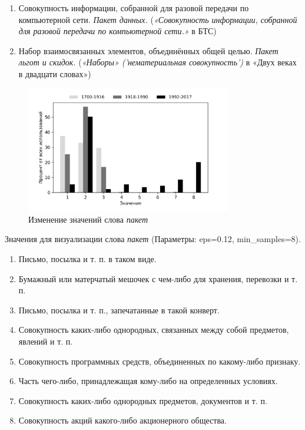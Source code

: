 \documentclass[LI,VKR]{HSEUniversity}
\begin{document}
\begin{enumerate}
    \item Совокупность информации, собранной для разовой передачи по компьютерной сети. \textit{Пакет данных.}
(\textit{«Совокупность информации, собранной для разовой передачи по компьютерной сети.»} в БТС)

    \item Набор взаимосвязанных элементов, объединённых общей целью. \textit{Пакет льгот и скидок.}
(\textit{«Наборы» ('нематериальная совокупность')} в «Двух веках в двадцати словах»)
\end{enumerate}

\begin{figure}[H]
	\centering
	\includegraphics[width=0.8\textwidth]{img/visualizations/paket_minimal}
	\caption{Изменение значений слова \textit{пакет}}
	\label{fig:Пакет}
\end{figure}

Значения для визуализации слова \textit{пакет} (Параметры: eps=0.12, min\_samples=8).

\begin{enumerate}
    \item Письмо, посылка и т. п. в таком виде.
    \item Бумажный или матерчатый мешочек с чем-либо для хранения, перевозки и т. п.
    \item Письмо, посылка и т. п., запечатанные в такой конверт.
    \item Совокупность каких-либо однородных, связанных между собой предметов, явлений и т. п.
    \item Совокупность программных средств, объединенных по какому-либо признаку.
    \item Часть чего-либо, принадлежащая кому-либо на определенных условиях.
    \item Совокупность каких-либо однородных предметов, документов и т. п.
    \item Совокупность акций какого-либо акционерного общества.
\end{enumerate}
\end{document}

